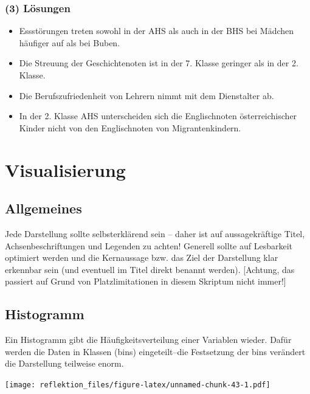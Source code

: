 \documentclass[
]{book}
\providecommand{\tightlist}{%
  \setlength{\itemsep}{0pt}\setlength{\parskip}{0pt}}
\begin{document}
\hypertarget{luxf6sungen-1}{%
\subsection{(3) Lösungen}\label{luxf6sungen-1}}

\begin{itemize}
\tightlist
\item
  Essstörungen treten sowohl in der AHS als auch in der BHS bei Mädchen häufiger auf als bei Buben.
\item
  Die Streuung der Geschichtenoten ist in der 7. Klasse geringer als in der 2. Klasse.
\item
  Die Berufszufriedenheit von Lehrern nimmt mit dem Dienstalter ab.
\item
  In der 2. Klasse AHS unterscheiden sich die Englischnoten österreichischer Kinder nicht von den Englischnoten von Migrantenkindern.
\end{itemize}

\hypertarget{visualisierung}{%
\chapter{Visualisierung}\label{visualisierung}}

\hypertarget{allgemeines-4}{%
\section{Allgemeines}\label{allgemeines-4}}

Jede Darstellung sollte selbsterklärend sein -- daher ist auf aussagekräftige Titel, Achsenbeschriftungen und Legenden zu achten! Generell sollte auf Lesbarkeit optimiert werden und die Kernaussage bzw. das Ziel der Darstellung klar erkennbar sein (und eventuell im Titel direkt benannt werden). {[}Achtung, das passiert auf Grund von Platzlimitationen in diesem Skriptum nicht immer!{]}

\hypertarget{histogramm}{%
\section{Histogramm}\label{histogramm}}

Ein Histogramm gibt die Häufigkeitsverteilung einer Variablen wieder. Dafür werden die Daten in Klassen (bins) eingeteilt--die Festsetzung der bins verändert die Darstellung teilweise enorm.

\texttt{[image: reflektion\_files/figure-latex/unnamed-chunk-43-1.pdf]}
\end{document}
